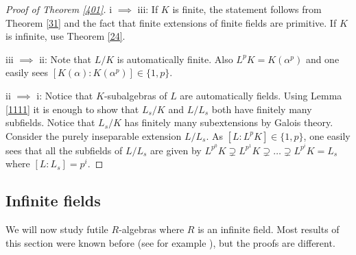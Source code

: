 \documentclass{amsart}
\theoremstyle{plain}
\theoremstyle{definition}
\begin{document}
\begin{proof}[Proof of Theorem \ref{401}]
 i $\implies$ iii: If $K$ is finite, the statement follows from Theorem \ref{31} and the fact that finite extensions of finite fields are primitive. If
$K$ is infinite, use Theorem \ref{24}.

 iii $\implies$ ii: Note that $L/K$ is automatically finite. Also $L^pK=K(\alpha^p)$ and one easily sees $[K(\alpha):K(\alpha^p)]\in \{1,p\}$. 

ii $\implies$ i: Notice that $K$-subalgebras of $L$ are automatically fields. Using Lemma \ref{1111} it is enough to show that $L_s/K$ and $L/L_s$ both have finitely many subfields.
Notice that $L_s/K$ has finitely many subextensions by Galois theory. Consider the purely inseparable extension $L/L_s$. As $[L:L^pK] \in
\{1,p\}$, one easily sees that all the subfields of $L/L_s$ are given by $L^{p^0}K \supsetneq L^{p^1}K \supsetneq \ldots \supsetneq L^{p^i}K=L_s$
where $[L:L_s]=p^i$.
\end{proof}

\subsection{Infinite fields}

We will now study futile $R$-algebras where $R$ is an infinite field. Most results of this section were known before (see for example \cite{DO1}), but
the proofs are different.
\end{document}
